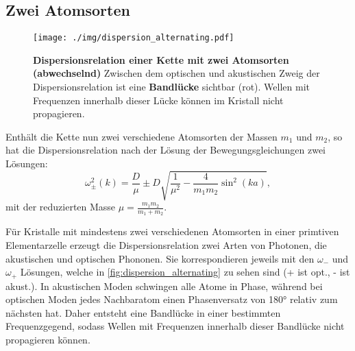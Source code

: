 \subsection{Zwei Atomsorten}
\begin{figure}[tbp]
	\centering
	\texttt{[image: ./img/dispersion\_alternating.pdf]}
	\caption{\textbf{Dispersionsrelation einer Kette mit zwei Atomsorten (abwechselnd)} Zwischen dem optischen und akustischen Zweig der Dispersionsrelation ist eine \textbf{Bandlücke} sichtbar (rot). Wellen mit Frequenzen innerhalb dieser Lücke können im Kristall nicht propagieren.}
	\label{fig:dispersion_alternating}
\end{figure}
Enthält die Kette nun zwei verschiedene Atomsorten der Massen $m_1$ und $m_2$, so hat die Dispersionsrelation nach der Lösung der Bewegungsgleichungen zwei Lösungen:
\begin{equation}
	\omega_\pm^2(k) = \frac{D}{\mu} \pm D\sqrt{\frac{1}{\mu^2} - \frac{4}{m_1 m_2}\sin^2\left(k a\right)},
\end{equation}
mit der reduzierten Masse $\mu = \frac{m_1 m_2}{m_1 + m_2}$.

Für Kristalle mit mindestens zwei verschiedenen Atomsorten in einer primtiven Elementarzelle erzeugt die Dispersionsrelation zwei Arten von Photonen, die akustischen und optischen Phononen.
Sie korrespondieren jeweils mit den $\omega_{-}$ und $\omega_{+}$ Lösungen, welche in \autoref{fig:dispersion_alternating} zu sehen sind (+ ist opt., - ist akust.).
In akustischen Moden schwingen alle Atome in Phase, während bei optischen Moden jedes Nachbaratom einen Phasenversatz von 180° relativ zum nächsten hat.
Daher entsteht eine Bandlücke in einer bestimmten Frequenzgegend, sodass Wellen mit Frequenzen innerhalb dieser Bandlücke nicht propagieren können.

